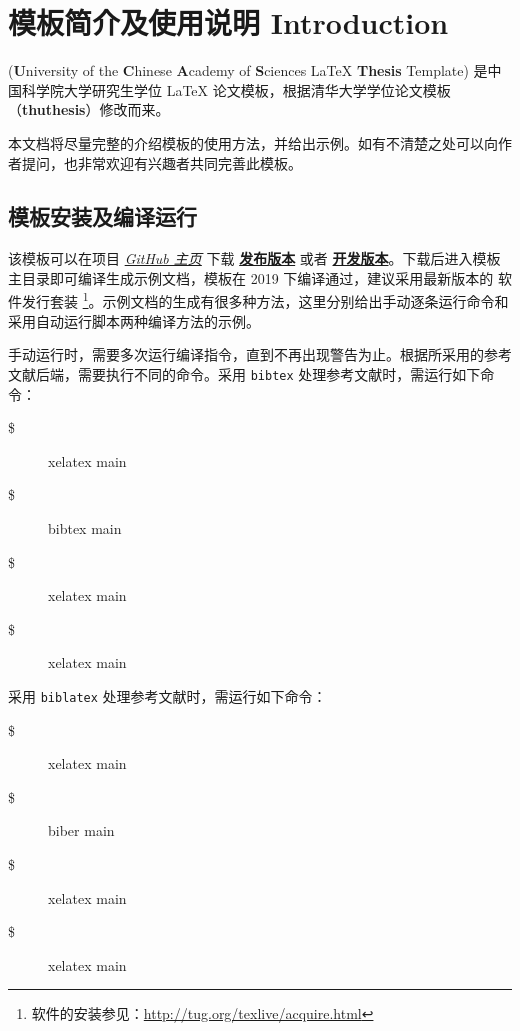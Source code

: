 \chapter{模板简介及使用说明 Introduction}
\label{cha:introduction}

\ucasthesis{}(\textbf{U}niversity of the \textbf{C}hinese \textbf{A}cademy of \textbf{S}ciences \LaTeX{} \textbf{Thesis} Template) 是中国科学院大学研究生学位 \LaTeX{} 论文模板，根据清华大学学位论文模板（\textbf{thuthesis}）修改而来。

本文档将尽量完整的介绍模板的使用方法，并给出示例。如有不清楚之处可以向作者提问，也非常欢迎有兴趣者共同完善此模板。

\section{模板安装及编译运行}
\label{sec:install}

该模板可以在项目 \href{https://github.com/tuxify/ucasthesis}{\emph{GitHub 主页}} 下载 \href{https://github.com/tuxify/ucasthesis/releases}{\textbf{发布版本}} 或者 \href{https://codeload.github.com/tuxify/ucasthesis/zip/master}{\textbf{开发版本}}。下载后进入模板主目录即可编译生成示例文档，模板在 \TeXLive{} 2019 下编译通过，建议采用最新版本的 \TeXLive{} 软件发行套装 \footnote{软件的安装参见：\url{http://tug.org/texlive/acquire.html}}。示例文档的生成有很多种方法，这里分别给出手动逐条运行命令和采用自动运行脚本两种编译方法的示例。

手动运行时，需要多次运行编译指令，直到不再出现警告为止。根据所采用的参考文献后端，需要执行不同的命令。采用 \texttt{bibtex} 处理参考文献时，需运行如下命令：
\begin{description}
  \item[\$] xelatex main
  \item[\$] bibtex main
  \item[\$] xelatex main
  \item[\$] xelatex main
\end{description}

采用 \texttt{biblatex} 处理参考文献时，需运行如下命令：
\begin{description}
  \item[\$] xelatex main
  \item[\$] biber main
  \item[\$] xelatex main
  \item[\$] xelatex main
\end{description}

